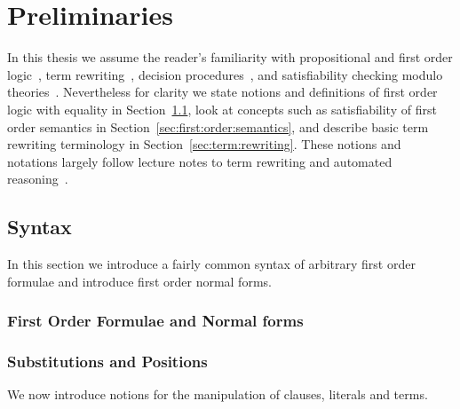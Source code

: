 
\chapter{Preliminaries}

%

In this thesis we assume the reader's familiarity with
propositional and first order logic~\cite{Huth:2004:LCS:975331},
term rewriting~\cite{Baader:1998:TR:280474},
decision procedures~\cite{Kroening:2008:DPA:1391237},
and satisfiability checking modulo theories~\cite{Biere:2009:HSV:1550723}.
Nevertheless for clarity we state notions and  definitions
of first order logic with equality in Section~\ref{sec:first:order:syntax},
look at concepts such as satisfiability of first order semantics in Section~\ref{sec:first:order:semantics},
and describe basic term rewriting terminology in Section~\ref{sec:term:rewriting}.
These notions and notations largely follow lecture notes to term rewriting and automated reasoning~\cite{AM2015tr, GM2013ar}.

\section{Syntax}\label{sec:first:order:syntax}

In this section we introduce a fairly common syntax of 
arbitrary first order formulae and introduce first order normal forms.







\subsection{First Order Formulae and Normal forms}





\subsection{Substitutions and Positions}

We now introduce notions for the manipulation
of clauses, literals and terms.

